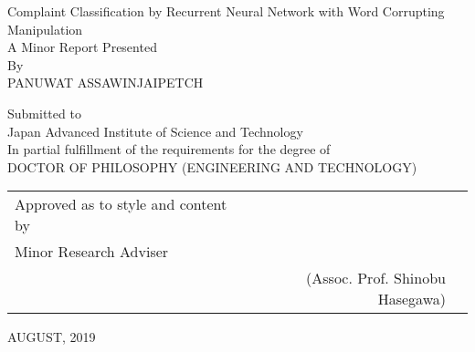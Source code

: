 
\setlength{\parindent}{4em}
\setlength{\parskip}{1em}
\renewcommand{\baselinestretch}{2.0} 
\begin{center}
        \large{Complaint Classification by Recurrent Neural Network with Word Corrupting Manipulation}\\


        \normalsize{A Minor Report Presented}\\      
        By \\  
        PANUWAT ASSAWINJAIPETCH
        
        \normalsize{Submitted to\\
Japan Advanced Institute of Science and Technology\\
In partial fulfillment of the requirements for the degree of\\
DOCTOR OF PHILOSOPHY (ENGINEERING AND TECHNOLOGY)
}


 \vfill{} 
 \begin{table}[hb!]
\begin{tabular}{lrr}
Approved as to style and content by & &\\\cline{3-3}
Minor Research Adviser  & \multicolumn{1}{r|}{\underline{\hspace{5cm}}} & \multicolumn{1}{l|}{}  \\\cline{3-3}
 &  (Assoc. Prof. Shinobu Hasegawa) &\\
 


\end{tabular}
\end{table}

AUGUST, 2019
\end{center}
